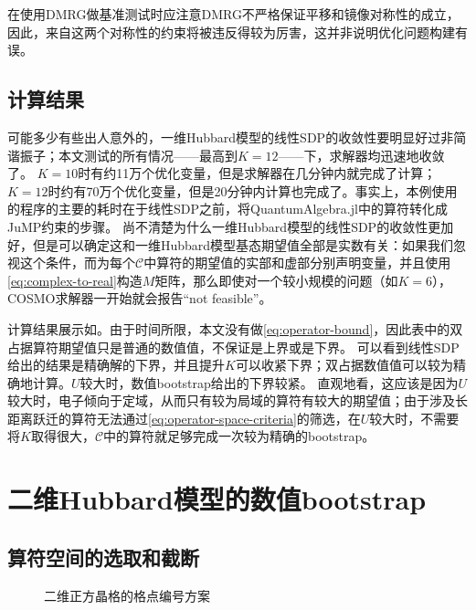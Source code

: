 \documentclass[oneside]{fduthesis}
\begin{document}
在使用DMRG做基准测试时应注意DMRG不严格保证平移和镜像对称性的成立，因此，来自这两个对称性的约束将被违反得较为厉害，这并非说明优化问题构建有误。

\subsection{计算结果}

可能多少有些出人意外的，一维Hubbard模型的线性SDP的收敛性要明显好过非简谐振子；本文测试的所有情况——最高到$K=12$——下，求解器均迅速地收敛了。
$K=10$时有约11万个优化变量，但是求解器在几分钟内就完成了计算；$K=12$时约有70万个优化变量，但是20分钟内计算也完成了。事实上，本例使用的程序的主要的耗时在于线性SDP之前，将QuantumAlgebra.jl中的算符转化成JuMP约束的步骤。
尚不清楚为什么一维Hubbard模型的线性SDP的收敛性更加好，但是可以确定这和一维Hubbard模型基态期望值全部是实数有关：如果我们忽视这个条件，而为每个$\mathcal{C}$中算符的期望值的实部和虚部分别声明变量，并且使用\eqref{eq:complex-to-real}构造$M$矩阵，那么即使对一个较小规模的问题（如$K=6$），COSMO求解器一开始就会报告“not feasible”。



计算结果展示如。由于时间所限，本文没有做\eqref{eq:operator-bound}，因此表中的双占据算符期望值只是普通的数值值，不保证是上界或是下界。
可以看到线性SDP给出的结果是精确解的下界，并且提升$K$可以收紧下界；双占据数值值可以较为精确地计算。$U$较大时，数值bootstrap给出的下界较紧。
直观地看，这应该是因为$U$较大时，电子倾向于定域，从而只有较为局域的算符有较大的期望值；由于涉及长距离跃迁的算符无法通过\eqref{eq:operator-space-criteria}的筛选，在$U$较大时，不需要将$K$取得很大，$\mathcal{C}$中的算符就足够完成一次较为精确的bootstrap。

\section{二维Hubbard模型的数值bootstrap}

\subsection{算符空间的选取和截断}

\begin{figure}
    \centering
    
    \caption{二维正方晶格的格点编号方案}
    \label{fig:site-index-2d}
\end{figure}
\end{document}
